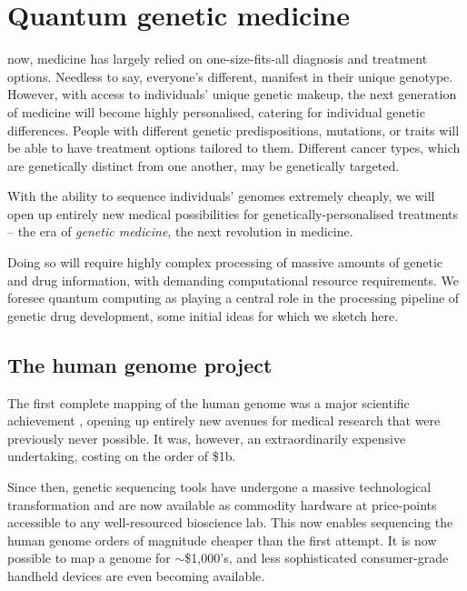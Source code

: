 %
%

\section{Quantum genetic medicine}\label{sec:genetic_medicine}

 now, medicine has largely relied on one-size-fits-all diagnosis and treatment options. Needless to say, everyone's different, manifest in their unique genotype. However, with access to individuals' unique genetic makeup, the next generation of medicine will become highly personalised, catering for individual genetic differences. People with different genetic predispositions, mutations, or traits will be able to have treatment options tailored to them. Different cancer types, which are genetically distinct from one another, may be genetically targeted.

With the ability to sequence individuals' genomes extremely cheaply, we will open up entirely new medical possibilities for genetically-personalised treatments -- the era of \textit{genetic medicine}, the next revolution in medicine.

Doing so will require highly complex processing of massive amounts of genetic and drug information, with demanding computational resource requirements. We foresee quantum computing as playing a central role in the processing pipeline of genetic drug development, some initial ideas for which we sketch here.

%
%

\subsection{The human genome project}

The first complete mapping of the human genome was a major scientific achievement \cite{humanGenomeProject}, opening up entirely new avenues for medical research that were previously never possible. It was, however, an extraordinarily expensive undertaking, costing on the order of \$1b.

Since then, genetic sequencing tools have undergone a massive technological transformation and are now available as commodity hardware at price-points accessible to any well-resourced bioscience lab. This now enables sequencing the human genome orders of magnitude cheaper than the first attempt. It is now possible to map a genome for $\sim$\$1,000's, and less sophisticated consumer-grade handheld devices are even becoming available.

